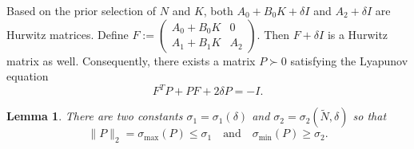 \documentclass[review]{elsarticle}
\newtheorem{lemma}[theorem]{Lemma}
\numberwithin{equation}{section}
\begin{document}
Based on the prior selection of $N$ and $K$, both $A_0+B_0K+\delta I$ and $A_2+\delta I$ are Hurwitz matrices. Define $F:=\left(\begin{array}{cc}
A_0+B_0 K & 0 \\
A_1+B_1K & A_2
\end{array}\right)$. Then $F+\delta I$ is a Hurwitz matrix as well. Consequently, there exists a matrix $P\succ 0$ satisfying the Lyapunov equation
\begin{equation}
\label{ly-eq}
    F^TP+PF+2\delta P=-I.
\end{equation}
\begin{lemma}
    \label{eig-of-P}
  There are two constants $\sigma_1=\sigma_1\left(\delta\right)$ and $\sigma_2=\sigma_2\left(\tilde{N},\delta\right)$ so that
    \begin{equation}
        \label{spectrum-P}
        \|P\|_2=\sigma_{\max}(P)\le \sigma_1\quad \text{and}\quad  \sigma_{\min}(P)\ge \sigma_2.
    \end{equation}
\end{lemma}
\end{document}
